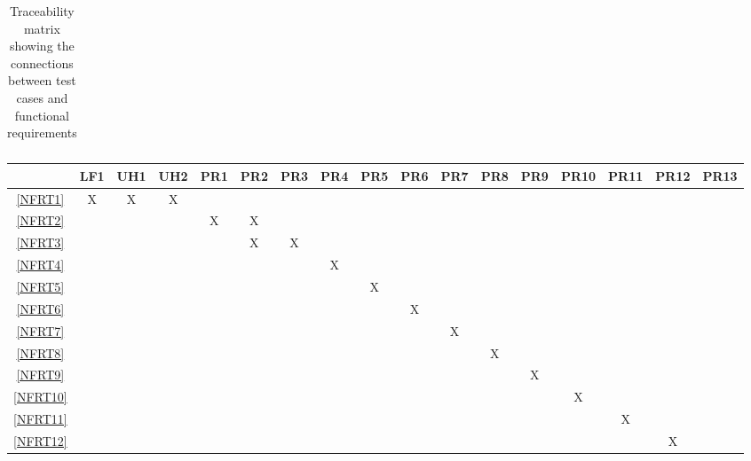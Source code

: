 \documentclass[12pt, titlepage]{article}
\begin{document}
\begin{landscape}
\begin{table}[h!]
\begin{tabular}{|c|c|c|c|c|c|c|c|c|c|c|c|c|c|c|c|c|}
    \end{tabular}
    \caption{Traceability matrix showing the connections between test cases
      and functional requirements}
    \label{tab:frt}
  \end{table}
  \begin{table}[h!]
    \centering
    \begin{tabular}{|c|c|c|c|c|c|c|c|c|c|c|c|c|c|c|c|c|} \hline
                & LF1 & UH1 & UH2 & PR1 & PR2 & PR3 & PR4 & PR5 & PR6 & PR7 & PR8 & PR9 & PR10 & PR11 & PR12 & PR13 \\ \hline
      \ref{NFRT1}  & X   & X   & X   &     &     &     &     &     &     &     &     &     &      &      &      &      \\ \hline
      \ref{NFRT2}  &     &     &     & X   & X   &     &     &     &     &     &     &     &      &      &      &      \\ \hline
      \ref{NFRT3}  &     &     &     &     & X   & X   &     &     &     &     &     &     &      &      &      &      \\ \hline
      \ref{NFRT4}  &     &     &     &     &     &     & X   &     &     &     &     &     &      &      &      &      \\ \hline
      \ref{NFRT5}  &     &     &     &     &     &     &     & X   &     &     &     &     &      &      &      &      \\ \hline
      \ref{NFRT6}  &     &     &     &     &     &     &     &     & X   &     &     &     &      &      &      &      \\ \hline
      \ref{NFRT7}  &     &     &     &     &     &     &     &     &     & X   &     &     &      &      &      &      \\ \hline
      \ref{NFRT8}  &     &     &     &     &     &     &     &     &     &     & X   &     &      &      &      &      \\ \hline
      \ref{NFRT9}  &     &     &     &     &     &     &     &     &     &     &     & X   &      &      &      &      \\ \hline
      \ref{NFRT10} &     &     &     &     &     &     &     &     &     &     &     &     & X    &      &      &      \\ \hline
      \ref{NFRT11} &     &     &     &     &     &     &     &     &     &     &     &     &      & X    &      &      \\ \hline
      \ref{NFRT12} &     &     &     &     &     &     &     &     &     &     &     &     &      &      & X    &      \\ \hline

\end{tabular}
\end{table}
\end{landscape}
\end{document}
